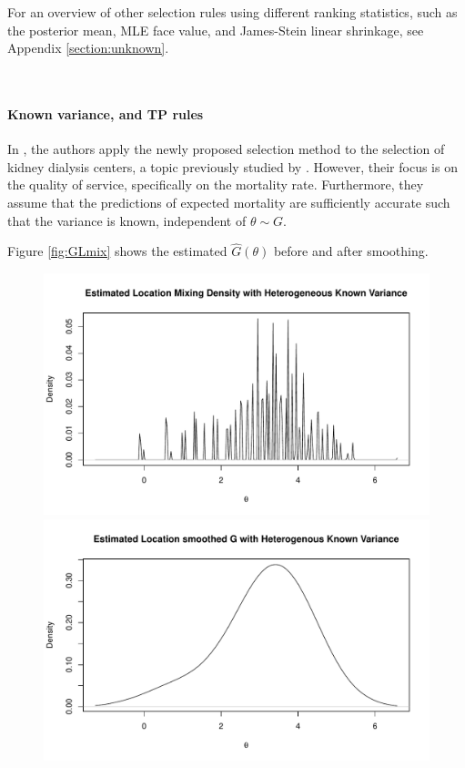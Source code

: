 \documentclass[12pt]{article}
\begin{document}
For an overview of other selection rules using different ranking statistics,
such as the posterior mean, MLE face value, and James-Stein linear shrinkage,
see Appendix \ref{section:unknown}.

\
\paragraph{Known variance, and TP rules}

In \citet{gu2023invidious}, the authors apply the newly proposed selection
method to the selection of kidney dialysis centers, a topic previously studied
by \citet{lin2006loss, lin2009ranking}. However, their focus is on the quality
of service, specifically on the mortality rate. Furthermore, they assume that
the predictions of expected mortality are sufficiently accurate such that the
variance is known, independent of $\theta \sim G$.

Figure \ref{fig:GLmix} shows the estimated $\hat{G}(\theta)$ before and after
smoothing.

\begin{figure}[h!]
    \centering
    \begin{minipage}{0.5\textwidth}
        \centering
        \includegraphics[width=\textwidth]{../../Figures/2013-2022/GMM_fd/GLmix.pdf}
    \end{minipage}\hfill
    \begin{minipage}{0.5\textwidth}
        \centering
        \includegraphics[width=\textwidth]{../../Figures/2013-2022/GMM_fd/GLmix_s.pdf}
    \end{minipage}
\end{figure}
\end{document}
